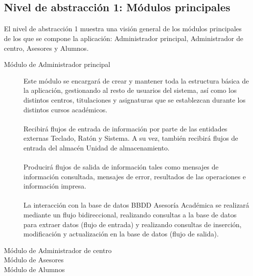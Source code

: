 \subsection{Nivel de abstracción 1: Módulos principales}

  \paragraph{}El nivel de abstracción 1 muestra una visión general de los
  módulos principales de los que se compone la aplicación: Administrador
  principal, Administrador de centro, Asesores y Alumnos.

  \begin{description}
   \item[Módulo de Administrador principal] Este módulo se encargará de
   crear y mantener toda la estructura básica de la aplicación, gestionando
   al resto de usuarios del sistema, así como los distintos centros,
   titulaciones y asignaturas que se establezcan durante los distintos cursos
   académicos.

   \paragraph{}Recibirá flujos de entrada de información por parte de las
   entidades externas Teclado, Ratón y Sistema. A su vez, también recibirá
   flujos de entrada del almacén Unidad de almacenamiento.

   \paragraph{}Producirá flujos de salida de información tales como mensajes de
   información consultada, mensajes de error, resultados de las operaciones e
   información impresa.

   \paragraph{}La interacción con la base de datos BBDD Asesoría Académica se
   realizará mediante un flujo bidireccional, realizando consultas a la base de
   datos para extraer datos (flujo de entrada) y realizando consultas de
   inserción, modificación y actualización en la base de datos (flujo de
   salida).

   \item[Módulo de Administrador de centro]
   \item[Módulo de Asesores]
   \item[Módulo de Alumnos]
  \end{description}

